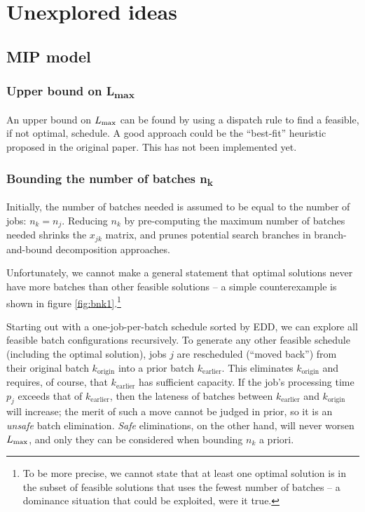 \chapter{Unexplored ideas}
\section{MIP model}
\subsection[Upper bound on $\Lmax$]{Upper bound on {\sansitalicfont L}\textsubscript{max}}
An upper bound on $\Lmax$ can be found by using a dispatch rule to find a
feasible, if not optimal, schedule. A good approach could be the ``best-fit''
heuristic proposed in the original paper. {\color{darkred} This has not been
implemented yet.}

\subsection[Bounding the number of batches $n_k$]{Bounding the number of batches \sansitalicfont n\textsubscript{k}}
Initially, the number of batches needed is assumed to be equal to the number of
jobs: $n_k = n_j$. Reducing $n_k$ by pre-computing the maximum number of batches
needed shrinks the $x_{jk}$ matrix, and prunes potential search branches in
branch-and-bound decomposition approaches.


Unfortunately, we cannot make a general statement that optimal solutions never
have more batches than other feasible solutions -- a simple counterexample is
shown in figure \ref{fig:bnk1}.\footnote{To be more precise, we cannot state
that at least one optimal solution is in the subset of feasible solutions that
uses the fewest number of batches -- a dominance situation that could be
exploited, were it true.}

Starting out with a one-job-per-batch schedule sorted by EDD, we can explore
all feasible batch configurations recursively. To generate any other feasible
schedule (including the optimal solution), jobs $j$ are rescheduled (``moved back'')
from their original batch $k_\text{origin}$ into a prior batch
$k_\text{earlier}$. This eliminates $k_\text{origin}$ and requires, of course,
that $k_\text{earlier}$ has sufficient capacity. If the job's processing time
$p_j$ exceeds that of $k_\text{earlier}$, then the lateness of batches between
$k_\text{earlier}$ and $k_\text{origin}$ will increase; the merit of such a move
cannot be judged in prior, so it is an \textit{unsafe} batch elimination.
\textit{Safe} eliminations, on the other hand, will never worsen $\Lmax$, and
only they can be considered when bounding $n_k$ a priori.

